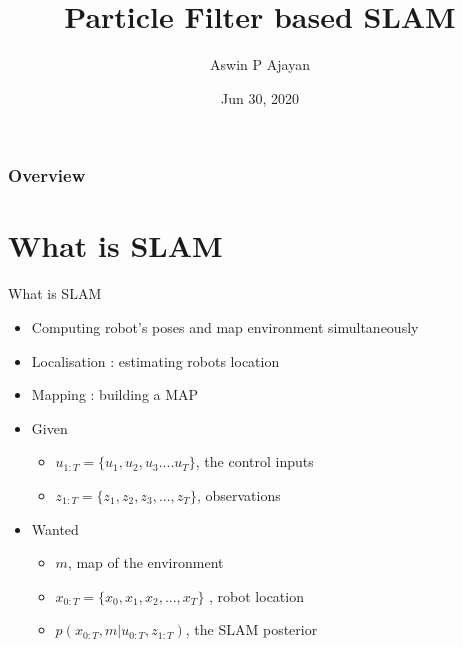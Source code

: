 \documentclass{beamer}
\title[Short title]{Particle Filter based SLAM} %
\author{Aswin P Ajayan} %
\institute[Indian Institute of Technology, Bombay] %
{
Indian Institute of Technology, Bombay\\ %
\medskip
}
\date{Jun 30, 2020} %
\begin{document}
\begin{frame}
\titlepage %
\end{frame}

\begin{frame}
\frametitle{Overview} %
\tableofcontents %
\end{frame}



\section{What is SLAM}
\begin{frame}{What is SLAM}
    \begin{itemize}
    \item Computing robot's poses and map environment simultaneously \\
    \item Localisation : estimating robots location\\ 
    \item Mapping      : building a MAP\\
    \item Given
    \begin{itemize}
        \item $u_{1:T} = \{u_1,u_2,u_3....u_T\}$, the control inputs
        \item $z_{1:T} = \{z_1,z_2,z_3,...,z_T\}$, observations

    \end{itemize}
\item Wanted
    \begin{itemize}
    \item $m$, map of the environment
    \item $x_{0:T} = \{x_0,x_1,x_2,...,x_T\}$ , robot location
    \item $p(x_{0:T},m | u_{0:T},z_{1:T})$, the SLAM posterior
        \end{itemize}
\end{itemize}


\end{frame}
\end{document}
